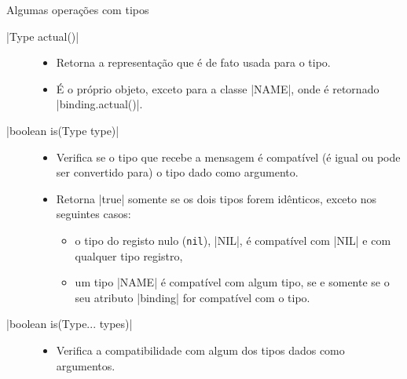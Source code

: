 \documentclass[smaller]{beamer}
\begin{document}
\begin{frame}{Algumas operações com tipos}
  \begin{description}
    \item[\pyginline|Type actual()|]\mbox{}\newline
    \begin{itemize}
      \item Retorna a representação que é de fato usada para o tipo.
      \item É o próprio objeto, exceto para a classe \pyginline|NAME|, onde
      é retornado \pyginline|binding.actual()|.
    \end{itemize}
    \framebreak
    
    \item[\pyginline|boolean is(Type type)|]\mbox{}\newline
    \begin{itemize}
      \item Verifica se o tipo que recebe a mensagem é compatível (é igual
      ou pode ser convertido para) o tipo dado como argumento.
      \item Retorna \pyginline|true| somente se os dois tipos forem
      idênticos, exceto nos seguintes casos:
      \begin{itemize}
        \item o tipo do registo nulo (\texttt{nil}), \pyginline|NIL|, é
        compatível com \pyginline|NIL| e com qualquer tipo registro,
        \item um tipo \pyginline|NAME| é compatível com algum tipo, se
        e somente se o seu atributo \pyginline|binding| for compatível
        com o tipo.
      \end{itemize}
    \end{itemize}
    \framebreak

    \item[\pyginline|boolean is(Type... types)|]\mbox{}\newline
    \begin{itemize}
      \item Verifica a compatibilidade com algum dos tipos dados como
      argumentos.
    \end{itemize}
  \end{description}
\end{frame}
\end{document}
